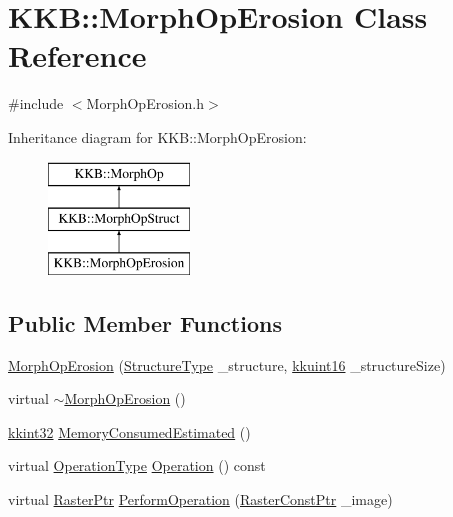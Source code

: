 \hypertarget{class_k_k_b_1_1_morph_op_erosion}{}\section{K\+KB\+:\+:Morph\+Op\+Erosion Class Reference}
\label{class_k_k_b_1_1_morph_op_erosion}


{\ttfamily \#include $<$Morph\+Op\+Erosion.\+h$>$}

Inheritance diagram for K\+KB\+:\+:Morph\+Op\+Erosion\+:\begin{figure}[H]
\begin{center}
\leavevmode
\includegraphics[height=3.000000cm]{class_k_k_b_1_1_morph_op_erosion}
\end{center}
\end{figure}
\subsection*{Public Member Functions}
\begin{DoxyCompactItemize}
\item 
\hyperlink{class_k_k_b_1_1_morph_op_erosion_ac6d7115e1764e373d9d51e7269a41863}{Morph\+Op\+Erosion} (\hyperlink{class_k_k_b_1_1_morph_op_a09e4aff7e81327849855ff72082d85b3}{Structure\+Type} \+\_\+structure, \hyperlink{namespace_k_k_b_aa8c7d4d30381c8a0b6fce68974a9c8a9}{kkuint16} \+\_\+structure\+Size)
\item 
virtual \hyperlink{class_k_k_b_1_1_morph_op_erosion_abe6abe355fbb18954be0e084ee4bc966}{$\sim$\+Morph\+Op\+Erosion} ()
\item 
\hyperlink{namespace_k_k_b_a8fa4952cc84fda1de4bec1fbdd8d5b1b}{kkint32} \hyperlink{class_k_k_b_1_1_morph_op_erosion_add8871dc782e9e2e3e8fb3ab435adc53}{Memory\+Consumed\+Estimated} ()
\item 
virtual \hyperlink{class_k_k_b_1_1_morph_op_a32070d9c14d16849873a8a409f5b0d69}{Operation\+Type} \hyperlink{class_k_k_b_1_1_morph_op_erosion_a3fa77279197c70aed5ef55968eb2704a}{Operation} () const 
\item 
virtual \hyperlink{namespace_k_k_b_a80d46bd24db644a022c863bce8ae3633}{Raster\+Ptr} \hyperlink{class_k_k_b_1_1_morph_op_erosion_a1cee95de95d4ebc3616631a41d80d23e}{Perform\+Operation} (\hyperlink{namespace_k_k_b_a5acfa7402dc4df1769f90d3dc8ddfc2c}{Raster\+Const\+Ptr} \+\_\+image)
\end{DoxyCompactItemize}

